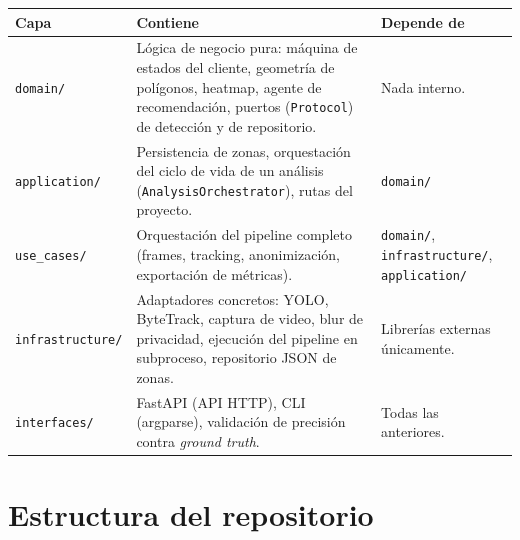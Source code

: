\documentclass[11pt,a4paper]{report}
\begin{document}
\begin{longtable}{>{\raggedright\footnotesize\arraybackslash}p{2.2cm} >{\raggedright\footnotesize\arraybackslash}p{6.0cm} >{\raggedright\footnotesize\arraybackslash}p{6.4cm}}
\toprule
\rowcolor{rvCodeBg}\textbf{Capa} & \textbf{Contiene} & \textbf{Depende de} \\
\midrule
\endhead
\texttt{domain/} & Lógica de negocio pura: máquina de estados del cliente, geometría de
polígonos, heatmap, agente de recomendación, puertos (\texttt{Protocol}) de detección y de
repositorio. & Nada interno. \\
\texttt{application/} & Persistencia de zonas, orquestación del ciclo de vida de un análisis
(\texttt{AnalysisOrchestrator}), rutas del proyecto. & \texttt{domain/} \\
\texttt{use\_cases/} & Orquestación del pipeline completo (frames, tracking, anonimización,
exportación de métricas). & \texttt{domain/}, \texttt{infrastructure/}, \texttt{application/} \\
\texttt{infrastructure/} & Adaptadores concretos: YOLO, ByteTrack, captura de video, blur de
privacidad, ejecución del pipeline en subproceso, repositorio JSON de zonas. & Librerías
externas únicamente. \\
\texttt{interfaces/} & FastAPI (API HTTP), CLI (argparse), validación de precisión contra
\textit{ground truth}. & Todas las anteriores. \\
\bottomrule
\end{longtable}

\section{Estructura del repositorio}
\end{document}
